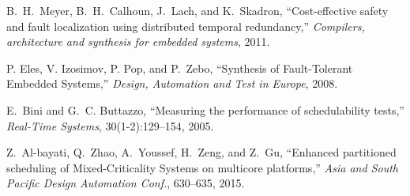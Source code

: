 \documentclass[conference]{IEEEtran}
\begin{document}
\begin{thebibliography}{10}
\vspace{-0.5mm}
B.~H.~Meyer, B.~H.~Calhoun,  J.~Lach, and K.~Skadron,
``Cost-effective safety and fault localization using distributed temporal redundancy,''
\emph{Compilers, architecture and synthesis for embedded systems}, 2011.


\vspace{-0.5mm}
P. Eles, V. Izosimov, P. Pop, and P.~Zebo, ``Synthesis of Fault-Tolerant Embedded Systems,''
\emph{Design, Automation and Test in Europe}, 2008.


\vspace{-0.5mm}
E.~Bini and G.~C. Buttazzo, ``Measuring the performance of schedulability
  tests,'' \emph{Real-Time Systems}, 30(1-2):129--154, 2005.

\vspace{-0.5mm}
Z.~Al-bayati, Q.~Zhao, A.~Youssef, H.~Zeng, and Z.~Gu, ``Enhanced partitioned scheduling of Mixed-Criticality Systems on multicore platforms,'' \emph{Asia and South Pacific Design Automation Conf.}, 630--635, 2015.






\end{thebibliography}




\end{document}
